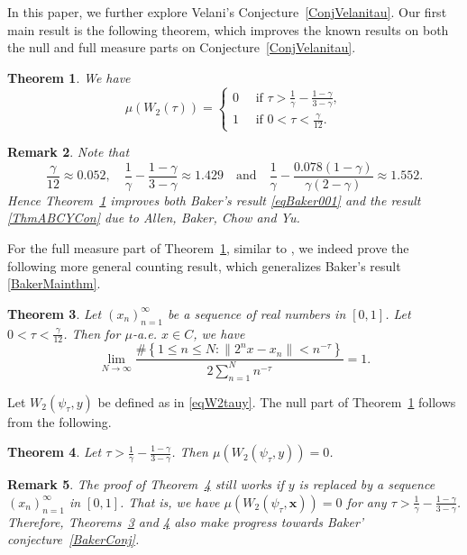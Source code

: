 \documentclass[10pt,a4paper]{amsart}
\numberwithin{equation}{section} %
\newtheorem{thm}{Theorem}[section]
\newtheorem{rem}[thm]{Remark}
\begin{document}
In this paper, we  further explore Velani's Conjecture~\ref{ConjVelanitau}.  Our first main result is the following theorem, which improves the known results on both the null and  full measure parts on Conjecture~\ref{ConjVelanitau}. 

\begin{thm}\label{MainThm0}
We have 
\[\mu(W_2(\tau))=\begin{cases}
	0 \quad  \text{ if }\tau>\frac{1}{\gamma}-\frac{1-\gamma}{3-\gamma},\\
	1 \quad \text{ if }0<\tau<\frac{\gamma}{12}.
\end{cases}\]
\end{thm}
\begin{rem}
Note that \[\frac{\gamma}{12}\approx 0.052, \quad \frac{1}{\gamma}-\frac{1-\gamma}{3-\gamma}\approx 1.429 \quad \text{and} \quad \frac{1}{\gamma}-\frac{0.078(1-\gamma)}{\gamma(2-\gamma)} \approx1.552.\]
Hence Theorem~\ref{MainThm0} improves both Baker's result \eqref{eqBaker001} and the result \eqref{ThmABCYCon} due to Allen, Baker, Chow and Yu. 
\end{rem}

For the full measure part of Theorem~\ref{MainThm0}, similar to \cite{Baker25A}, we indeed prove the following more general counting result, which generalizes Baker's result \eqref{BakerMainthm}.

\begin{thm}\label{Mainthm}
Let $(x_{n})_{n=1}^{\infty}$ be a sequence of real numbers in $[0,1]$. Let $0<\tau<\frac{\gamma}{12}$. Then for $\mu$-a.e. $x\in C$, we have  $$\lim_{N\to\infty}\frac{\#\left\{1\leq n\leq  N:\|2^nx-x_n\|<n^{-\tau}\right\}}{2\sum_{n=1}^{N}n^{-\tau}}=1.$$ 
\end{thm}

 


Let $W_{2}(\psi_{\tau},y)$ be defined as in \eqref{eqW2tauy}. The null part of Theorem~\ref{MainThm0} follows from the following. 


\begin{thm}\label{thmconverge}
Let \(\tau>\frac{1}{\gamma}-\frac{1-\gamma}{3-\gamma}\). Then
	\(\mu (W_{2}(\psi_{\tau},y)) = 0\).
\end{thm}

\begin{rem}  
 The proof of Theorem~\ref{thmconverge} still works if $y$ is replaced by a sequence $(x_{n})_{n=1}^{\infty}$ in $[0,1]$.
	That is, we have $\mu(W_{2}(\psi_{\tau},\mathbf{x}))=0$ for any $\tau>\frac{1}{\gamma}-\frac{1-\gamma}{3-\gamma}$. Therefore, Theorems~\ref{Mainthm} and \ref{thmconverge} also make progress towards Baker' conjecture~\eqref{BakerConj}. 
\end{rem}
\end{document}
